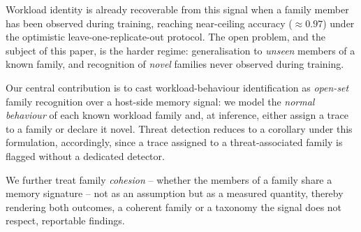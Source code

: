 \documentclass[conference]{IEEEtran}
\begin{document}
Workload identity is already recoverable from this signal when a family member has been
observed during training, reaching near-ceiling accuracy ($\approx 0.97$) under the
optimistic leave-one-replicate-out protocol. The open problem, and the subject of this
paper, is the harder regime: generalisation to \emph{unseen} members of a known family,
and recognition of \emph{novel} families never observed during training.

Our central contribution is to cast workload-behaviour identification as \emph{open-set}
family recognition over a host-side memory signal: we model the \emph{normal behaviour}
of each known workload family and, at inference, either assign a trace to a family or
declare it novel. Threat detection reduces to a corollary under this formulation,
accordingly, since a trace assigned to a threat-associated family is flagged without a
dedicated detector.

We further treat family \emph{cohesion} -- whether the members of a family share a memory
signature -- not as an assumption but as a measured quantity, thereby rendering both
outcomes, a coherent family or a taxonomy the signal does not respect, reportable findings.
\end{document}
